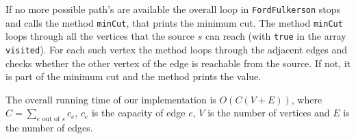 \documentclass{tufte-handout}
\begin{document}
If no more possible path's are available the overall loop in \verb#FordFulkerson# stops and calls the method \verb#minCut#, that prints the minimum cut. The method \verb#minCut# loops through all the vertices that the source $s$ can reach (with \verb#true# in the array \verb#visited#). For each such vertex the method loops through the adjacent edges and checks whether the other vertex of the edge is reachable from the source. If not, it is part of the minimum cut and the method prints the value.

The overall running time of our implementation is $O(C(V+E))$, where $C = \sum_{e\text{ out of }s} c_e$, $c_e$ is the capacity of edge $e$, $V$ is the number of vertices and $E$ is the number of edges.
\end{document}
